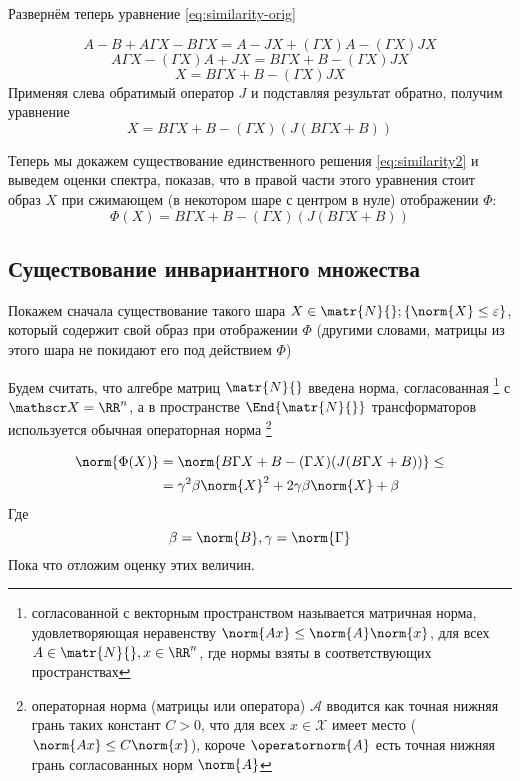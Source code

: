Развернём теперь уравнение \eqref{eq:similarity-orig}

\[
    A - B + A\Gamma X - B\Gamma X = A - JX + (\Gamma X) A - (\Gamma X) JX
    \]
\[
    A\Gamma X - (\Gamma X) A + JX = B \Gamma X + B - (\Gamma X) JX
    \]
\[
    X = B \Gamma X + B - (\Gamma X) JX
    \]
Применяя слева обратимый оператор \( J \) и подставляя результат обратно, получим уравнение
\begin{equation}\label{eq:similarity2}
    X = B \Gamma X + B - (\Gamma X) (J(B\Gamma X + B))
\end{equation}

Теперь мы докажем существование единственного решения \eqref{eq:similarity2}
и выведем оценки спектра,
показав, что в правой части этого уравнения стоит образ \( X \)
при сжимающем (в некотором шаре с центром в нуле) отображении \( \Phi \):
\[ \Phi(X) = B \Gamma X + B - (\Gamma X) (J(B\Gamma X + B)) \]

\subsection{Существование инвариантного множества}
Покажем сначала существование такого шара \( X\in\matr{N}{}; \{ \norm{X} \leq \varepsilon \} \),
который содержит свой образ при отображении \( \Phi \)
(другими словами, матрицы из этого шара
 не покидают его под действием \( \Phi \))

Будем считать, что алгебре матриц \( \matr{N}{} \)
введена норма, согласованная%
\footnote{согласованной с векторным пространством называется
матричная норма, удовлетворяющая неравенству \( \norm{A x} \leq \norm{A}\norm{x} \),
для всех \( A\in\matr{N}{}, x\in\RR^n \), где нормы взяты в соответствующих пространствах}
с \( \mathscr X = \RR^n \),
а в пространстве \( \End{\matr{N}{}} \) трансформаторов
используется обычная операторная норма%
\footnote{операторная норма
(матрицы или оператора) \( \mathcal A \)
вводится как точная нижняя грань таких констант \( C > 0 \),
что для всех \( x\in\mathscr X\) имеет место
(\( \norm{A x} \leq C \norm{x} \)), короче
\( \operatornorm{A} \) есть точная нижняя грань согласованных норм \( \norm{A} \)}

\begin{align*}
    \norm{\Phi(X)} &= \norm{B \Gamma X + B - (\Gamma X) (J(B\Gamma X + B))} \leq \\
    &= \gamma^2\beta\norm{X}^2 + 2\gamma\beta\norm{X} + \beta
\end{align*}
Где \[ \beta=\norm{B}, \gamma=\norm{\Gamma} \]
Пока что отложим оценку этих величин.

